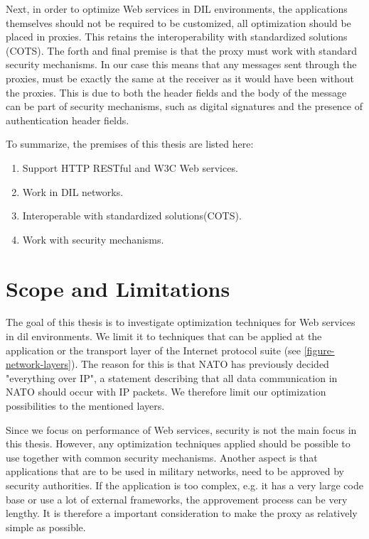 Next, in order to optimize Web services in DIL environments, the applications
themselves should not be required to be customized, all optimization should be
placed in proxies. This retains the interoperability with standardized solutions
(COTS). The forth and final premise is that the proxy must work with standard
security mechanisms. In our case this means that any messages sent through the
proxies, must be exactly the same at the receiver as it would have been without
the proxies. This is due to both the header fields and the body of the message
can be part of security mechanisms, such as digital signatures and the presence
of authentication header fields.

To summarize, the premises of this thesis are listed here:

\begin{enumerate}
    \item Support HTTP RESTful and W3C Web services.
    \item Work in DIL networks.
    \item Interoperable with standardized solutions(COTS).
    \item Work with security mechanisms.
\end{enumerate}

\section{Scope and Limitations}

The goal of this thesis is to investigate optimization techniques for Web
services in \gls{dil} environments. We limit it to techniques that can be
applied at the application or the transport layer of the Internet protocol
suite (see \cref{figure-network-layers}). The reason for this is that NATO has
previously decided "everything over IP", a statement describing that all data
communication in NATO should occur with IP packets\cite{nnec-study}. We
therefore limit our optimization possibilities to the mentioned layers.

Since we focus on performance of Web services, security is not the main focus in
this thesis. However, any optimization techniques applied should be possible to
use together with common security mechanisms. Another aspect is that
applications that are to be used in military networks, need to be approved by
security authorities. If the application is too complex, e.g. it has a very
large code base or use a lot of external frameworks, the approvement process can
be very lengthy. It is therefore a important consideration to make the proxy as
relatively simple as possible.


